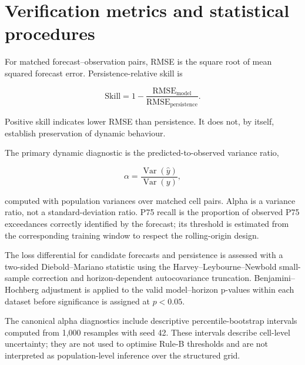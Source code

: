 \section{Verification metrics and statistical procedures}
\label{sec:metrics}

For matched forecast--observation pairs, RMSE is the square root of mean
squared forecast error. Persistence-relative skill is

\begin{equation}
\mathrm{Skill}=1-\frac{\mathrm{RMSE}_{\mathrm{model}}}
{\mathrm{RMSE}_{\mathrm{persistence}}}.
\label{eq:skill}
\end{equation}

Positive skill indicates lower RMSE than persistence. It does not, by
itself, establish preservation of dynamic behaviour.

The primary dynamic diagnostic is the predicted-to-observed variance ratio,

\begin{equation}
\alpha=\frac{\operatorname{Var}(\hat y)}{\operatorname{Var}(y)},
\label{eq:alpha}
\end{equation}

computed with population variances over matched cell pairs. Alpha is a
variance ratio, not a standard-deviation ratio. P75 recall is the
proportion of observed P75 exceedances correctly identified by the
forecast; its threshold is estimated from the corresponding training
window to respect the rolling-origin design.

The loss differential for candidate forecasts and persistence is assessed
with a two-sided Diebold--Mariano statistic using the
Harvey--Leybourne--Newbold small-sample correction and horizon-dependent
autocovariance truncation. Benjamini--Hochberg adjustment is applied to
the valid model--horizon p-values within each dataset before significance
is assigned at $p<0.05$.

The canonical alpha diagnostics include descriptive percentile-bootstrap
intervals computed from 1,000 resamples with seed 42. These intervals
describe cell-level uncertainty; they are not used to optimise Rule-B
thresholds and are not interpreted as population-level inference over the
structured grid.
